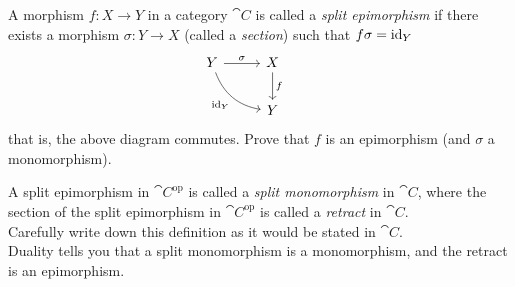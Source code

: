 \vspace{0.1in}

\begin{problem}\label{prob 2.4}
A morphism $f:X \to Y$ in a category $\cat{C}$ is called a \emph{split epimorphism} if there exists a morphism $\sigma: Y \to X$ (called a \emph{section}) such that $f\sigma = \operatorname{id}_Y$
\[\begin{tikzcd}
Y \arrow[rd, "\id_Y"', bend right] \arrow[r, "\sigma"] &[0.2em] X \arrow[d, "f"] &   \\[0.2em]
                                                   &                   Y
\end{tikzcd}\]
that is, the above diagram commutes. Prove that $f$ is an epimorphism (and $\sigma$ a monomorphism).
\end{problem}

\vspace{0.1in}

\begin{problem}\label{prob 2.4a}
A split epimorphism in $\cat{C}^{\text{op}}$ is called a \emph{split monomorphism} in $\cat{C}$, where the section of the split epimorphism in $\cat{C}^{\text{op}}$ is called a \emph{retract} in $\cat{C}$.\\[0.5em] Carefully write down this definition as it would be stated in $\cat{C}$.\\[1em]
Duality tells you that a split monomorphism is a monomorphism, and the retract is an epimorphism.
\end{problem}

\vspace{0.1in}

